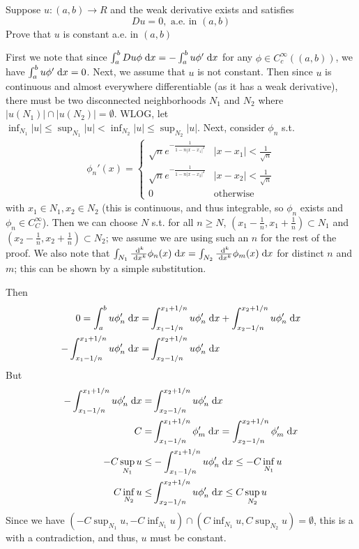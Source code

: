 Suppose $u: (a, b) \rightarrow R$ and the weak derivative exists and satisfies
$$
Du = 0, \text{ a.e. in } (a, b)
$$
Prove that $u$ is constant a.e. in $(a, b)$

First we note that since $\int_a^b Du \phi \;\mathrm{d}x = -\int_a^b u \phi' \;\mathrm{d}x$ for any $\phi \in C^\infty_c((a, b))$,
we have $\int_a^b u \phi' \;\mathrm{d}x = 0$.
Next, we assume that $u$ is not constant.
Then since $u$ is continuous and almost everywhere differentiable (as it has a weak derivative),
there must be two disconnected neighborhoods $N_1$ and $N_2$ where $|u(N_1)| \cap |u(N_2)| = \emptyset$.
WLOG, let $\inf_{N_1} |u| \leq \sup_{N_1} |u| < \inf_{N_2} |u| \leq \sup_{N_2} |u|$.
Next, consider $\phi_n$ s.t.
\begin{align*}
  \phi_n'(x) =
  \begin{cases}
    \sqrt{n} e^{-\frac{1}{1 - n |x - x_1|^2}} & |x - x_1| < \frac{1}{\sqrt{n}}\\
    \sqrt{n} e^{-\frac{1}{1 - n |x - x_2|^2}} & |x - x_2| < \frac{1}{\sqrt{n}}\\
    0 & \text{otherwise}
  \end{cases}
\end{align*}
with $x_1 \in N_1, x_2 \in N_2$ (this is continuous, and thus integrable, so $\phi_n$ exists and $\phi_n \in C^\infty_C$).
Then we can choose $N$ s.t. for all $n \geq N$, $\left(x_1 - \frac{1}{n}, x_1 + \frac{1}{n}\right) \subset N_1$
and $\left(x_2 - \frac{1}{n}, x_2 + \frac{1}{n}\right) \subset N_2$;
we assume we are using such an $n$ for the rest of the proof.
We also note that $\int_{N_1} \frac{\;\mathrm{d}^{k}}{\;\mathrm{d}x^{k}} \phi_n(x) \;\mathrm{d}x = \int_{N_2} \frac{\;\mathrm{d}^{k}}{\;\mathrm{d}x^{k}} \phi_m(x) \;\mathrm{d}x$
for distinct $n$ and $m$; this can be shown by a simple substitution.

Then
\begin{align*}
  0 = \int_a^b u \phi_n' \;\mathrm{d}x = &\int_{x_1 - 1/n}^{x_1 + 1/n} u \phi_n' \;\mathrm{d}x + \int_{x_2 - 1/n}^{x_2 + 1/n} u \phi_n' \;\mathrm{d}x\\
  -\int_{x_1 - 1/n}^{x_1 + 1/n} u \phi_n' \;\mathrm{d}x = &\int_{x_2 - 1/n}^{x_2 + 1/n} u \phi_n' \;\mathrm{d}x
\end{align*}
But
\begin{align*}
  -\int_{x_1 - 1/n}^{x_1 + 1/n} u \phi_n' \;\mathrm{d}x = &\int_{x_2 - 1/n}^{x_2 + 1/n} u \phi_n' \;\mathrm{d}x\\
  C = &\int_{x_1 - 1/n}^{x_1 + 1/n} \phi_m' \;\mathrm{d}x = \int_{x_2 - 1/n}^{x_2 + 1/n} \phi_m' \;\mathrm{d}x\\
  -C \sup_{N_1} u \leq &-\int_{x_1 - 1/n}^{x_1 + 1/n} u \phi_n' \;\mathrm{d}x \leq -C \inf_{N_1} u\\
  C \inf_{N_2} u \leq &\int_{x_2 - 1/n}^{x_2 + 1/n} u \phi_n' \;\mathrm{d}x \leq C \sup_{N_2} u\\
\end{align*}
Since we have $(-C \sup_{N_1} u, -C \inf_{N_1} u) \cap (C \inf_{N_1} u, C \sup_{N_2} u) = \emptyset$,
this is a with a contradiction, and thus, $u$ must be constant.
